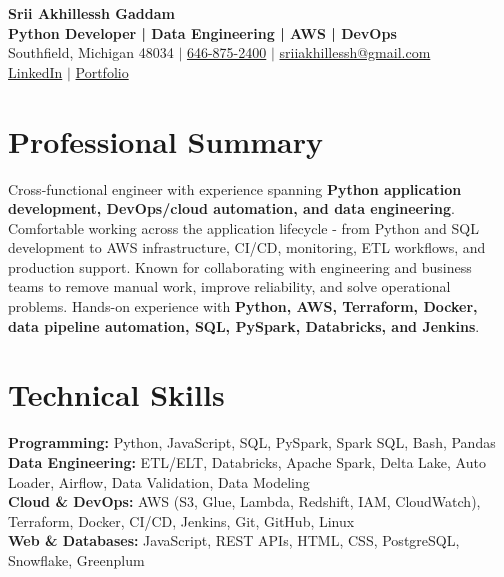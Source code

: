 \documentclass[letterpaper,10pt]{article}
\begin{document}
\fontsize{9.35pt}{10.45pt}\selectfont

\begin{center}
    {\LARGE \textbf{Srii Akhillessh Gaddam}} \\[-1pt]
    \textbf{Python Developer | Data Engineering | AWS | DevOps} \\[2pt]
    Southfield, Michigan 48034 $|$
    \href{tel:6468752400}{646-875-2400} $|$
    \href{mailto:sriiakhillessh@gmail.com}{sriiakhillessh@gmail.com} \\[1pt]
    \href{https://www.linkedin.com/in/srii-akhiilessh-gaddam-b48668191/}{LinkedIn} $|$
    \href{https://sriiakhillesshg.github.io/portfolio/}{Portfolio}
\end{center}
\vspace{-8pt}

\section{Professional Summary}
\small{Cross-functional engineer with experience spanning \textbf{Python application development, DevOps/cloud automation, and data engineering}. Comfortable working across the application lifecycle - from Python and SQL development to AWS infrastructure, CI/CD, monitoring, ETL workflows, and production support. Known for collaborating with engineering and business teams to remove manual work, improve reliability, and solve operational problems. Hands-on experience with \textbf{Python, AWS, Terraform, Docker, data pipeline automation, SQL, PySpark, Databricks, and Jenkins}.}

\section{Technical Skills}
\small{
\textbf{Programming:} Python, JavaScript, SQL, PySpark, Spark SQL, Bash, Pandas \\
\textbf{Data Engineering:} ETL/ELT, Databricks, Apache Spark, Delta Lake, Auto Loader, Airflow, Data Validation, Data Modeling \\
\textbf{Cloud \& DevOps:} AWS (S3, Glue, Lambda, Redshift, IAM, CloudWatch), Terraform, Docker, CI/CD, Jenkins, Git, GitHub, Linux \\
\textbf{Web \& Databases:} JavaScript, REST APIs, HTML, CSS, PostgreSQL, Snowflake, Greenplum
}
\end{document}
